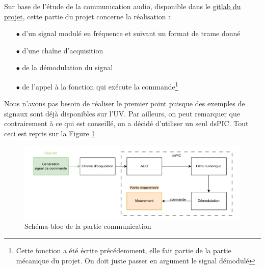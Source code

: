 Sur base de l'étude de la communication audio, disponible dans le \href{https://gitlab.com/mosee/elech309-2024}{gitlab du projet}, cette partie du projet concerne la réalisation :

\begin{enumerate}
    \item[$\bullet$] d'un signal modulé en fréquence et suivant un format de trame donné
    \item[$\bullet$] d'une chaîne d'acquisition
    \item[$\bullet$] de la démodulation du signal
    \item[$\bullet$] de l'appel à la fonction qui exécute la commande\footnote{Cette fonction a été écrite précédemment, elle fait partie de la partie mécanique du projet. On doit juste passer en argument le signal démodulé}
\end{enumerate}

Nous n'avons pas besoin de réaliser le premier point puisque des exemples de signaux sont déjà disponibles sur l'UV. Par ailleurs, on peut remarquer que contrairement à ce qui est conseillé, on a décidé d'utiliser un seul dsPIC. Tout ceci est repris sur la Figure \ref{fig:bloc_com}

\begin{figure}[H]
    \centering
    \includegraphics[scale=0.8]{pdffiles/diagramme_comm.pdf}
    \caption{Schéma-bloc de la partie communication}
    \label{fig:bloc_com}
\end{figure}